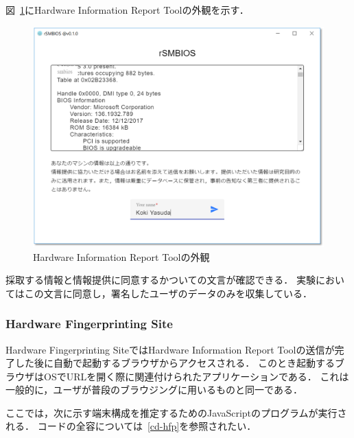 図~\ref{fig-rsmbios}にHardware Information Report Toolの外観を示す．

\begin{figure}[H]
	\centering
    \includegraphics[width=\textwidth,pagebox=artbox]{fig/rsmbios.png}
    \caption{Hardware Information Report Toolの外観}
    \label{fig-rsmbios}
\end{figure}

採取する情報と情報提供に同意するかついての文言が確認できる．
実験においてはこの文言に同意し，署名したユーザのデータのみを収集している．

\subsubsection{Hardware Fingerprinting Site}
Hardware Fingerprinting SiteではHardware Information Report Toolの送信が完了した後に自動で起動するブラウザからアクセスされる．
このとき起動するブラウザはOSでURLを開く際に関連付けられたアプリケーションである．
これは一般的に，ユーザが普段のブラウジングに用いるものと同一である．

ここでは，次に示す端末構成を推定するためのJavaScriptのプログラムが実行される．
コードの全容については~\ref{cd-hfp}を参照されたい．

